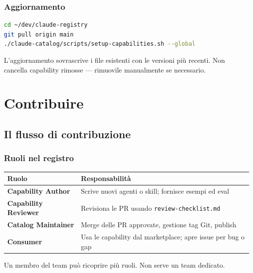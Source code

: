\documentclass[12pt,a4paper,twoside]{book}
\begin{document}
\section{Aggiornamento}

\begin{lstlisting}[language=bash]
cd ~/dev/claude-registry
git pull origin main
./claude-catalog/scripts/setup-capabilities.sh --global
\end{lstlisting}

L'aggiornamento sovrascrive i file esistenti con le versioni più recenti. Non cancella capability rimosse — rimuovile manualmente se necessario.

\part{Contribuire}

\chapter{Il flusso di contribuzione}

\section{Ruoli nel registro}

\begin{center}
\begin{tabular}{ll}
\toprule
\textbf{Ruolo} & \textbf{Responsabilità} \\
\midrule
\textbf{Capability Author} & Scrive nuovi agenti o skill; fornisce esempi ed eval \\
\textbf{Capability Reviewer} & Revisiona le PR usando \texttt{review-checklist.md} \\
\textbf{Catalog Maintainer} & Merge delle PR approvate, gestione tag Git, publish \\
\textbf{Consumer} & Usa le capability dal marketplace; apre issue per bug o gap \\
\bottomrule
\end{tabular}
\end{center}

Un membro del team può ricoprire più ruoli. Non serve un team dedicato.
\end{document}
